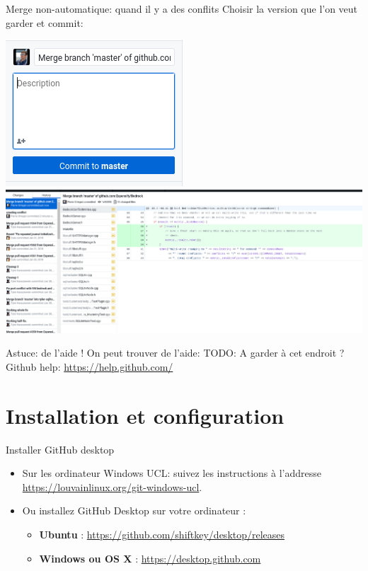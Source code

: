 \documentclass{beamer}
\begin{document}
\begin{frame}{Merge non-automatique: quand il y a des conflits}
    Choisir la version que l'on veut garder et commit:\\
    \begin{center}
	 	   \includegraphics[scale=0.4]{img/github_desktop/conflit_4.png}\\
	 	   \includegraphics[scale=0.2]{img/github_desktop/conflit_5.png}
    \end{center}
\end{frame}

\begin{frame}{Astuce: de l'aide !}
    On peut trouver de l'aide:
    TODO: A garder à cet endroit ?
        Github help: \url{https://help.github.com/}
\end{frame}


\section{Installation et configuration}

\begin{frame}{Installer GitHub desktop}
\begin{itemize}
    \item Sur les ordinateur Windows UCL: suivez les instructions à l'addresse {\small\url{https://louvainlinux.org/git-windows-ucl}}.
    \item Ou installez GitHub Desktop sur votre ordinateur :
    \begin{itemize}
        \item \textbf{Ubuntu} : \url{https://github.com/shiftkey/desktop/releases}
        \item \textbf{Windows ou OS X} : \url{https://desktop.github.com}
    \end{itemize}
\end{itemize}
\end{frame}
\end{document}
